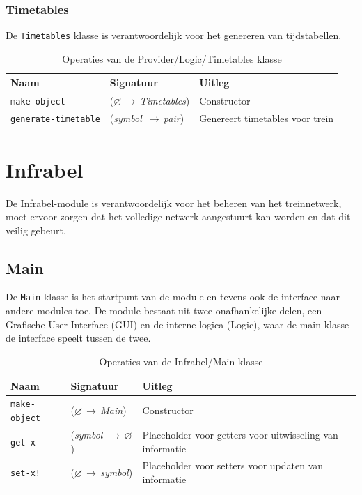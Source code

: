 \documentclass[a4paper, 11pt]{article}
\newcommand{\naar}{\,$\rightarrow$\,}
\renewcommand{\empty}{$\varnothing$}
\newcommand{\<}{\scriptsize\textless\normalsize}
\renewcommand{\>}{\scriptsize\textgreater\normalsize}
\begin{document}
\subsubsection{Timetables} %
De \texttt{Timetables} klasse is verantwoordelijk voor het genereren van tijdstabellen.
\begin{table}[H]
	\begin{center}
		\begin{tabular}{|l l l|}
			\hline
			\textbf{Naam} & \textbf{Signatuur} & \textbf{Uitleg}\\
			\hline
			\texttt{make-object} & (\empty \naar \textit{Timetables}) & Constructor\\
			\hline
			\texttt{generate-timetable} & (\textit{symbol} \naar \textit{pair}) & Genereert timetables voor trein\\
			\hline
		\end{tabular}
		\caption{Operaties van de Provider/Logic/Timetables klasse}
	\end{center}
\end{table}

\section{Infrabel} %
De Infrabel-module is verantwoordelijk voor het beheren van het treinnetwerk, moet ervoor zorgen dat het volledige netwerk aangestuurt kan worden en dat dit veilig gebeurt.

\subsection{Main} %
De \texttt{Main} klasse is het startpunt van de module en tevens ook de interface naar andere modules toe. De module bestaat uit twee onafhankelijke delen, een Grafische User Interface (GUI) en de interne logica (Logic), waar de main-klasse de interface speelt tussen de twee.
\begin{table}[H]
	\begin{center}
		\begin{tabular}{|l l l|}
			\hline
			\textbf{Naam} & \textbf{Signatuur} & \textbf{Uitleg}\\
			\hline
			\texttt{make-object} & (\empty \naar \textit{Main}) & Constructor\\
			\hline
			\texttt{get-x} & (\textit{symbol} \naar \empty) & Placeholder voor getters voor uitwisseling van informatie\\
			\texttt{set-x!} & (\empty \naar \textit{symbol}) & Placeholder voor setters voor updaten van informatie\\
			\hline
		\end{tabular}
		\caption{Operaties van de Infrabel/Main klasse}
	\end{center}
\end{table}
\end{document}
